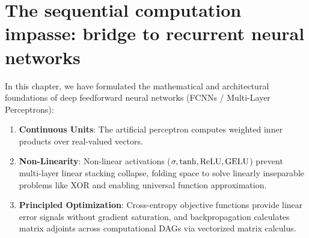 \documentclass[../../main.tex]{subfiles}
\begin{document}
\clearpage
\section{The sequential computation impasse: bridge to recurrent neural networks}
\label{sec:bridge_to_ch03}

In this chapter, we have formulated the mathematical and architectural foundations of deep feedforward neural networks (FCNNs / Multi-Layer Perceptrons):
\begin{enumerate}
    \item \textbf{Continuous Units}: The artificial perceptron computes weighted inner products over real-valued vectors.
    \item \textbf{Non-Linearity}: Non-linear activations ($\sigma, \tanh, \operatorname{\mathrm{ReLU}}, \operatorname{\mathrm{GELU}}$) prevent multi-layer linear stacking collapse, folding space to solve linearly inseparable problems like XOR and enabling universal function approximation.
    \item \textbf{Principled Optimization}: Cross-entropy objective functions provide linear error signals without gradient saturation, and backpropagation calculates matrix adjoints across computational DAGs via vectorized matrix calculus.
\end{enumerate}
\end{document}
